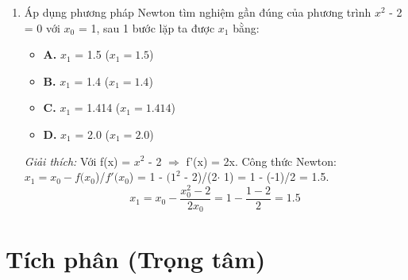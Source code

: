 \documentclass[11pt,a4paper,oneside]{book}
\begin{document}
\begin{enumerate}[label=\textbf{Câu \arabic*:}, leftmargin=2.2em, itemsep=8pt]
  \item Áp dụng phương pháp Newton tìm nghiệm gần đúng của phương trình $x^2$ - 2 = 0 với $x_0$ = 1, sau 1 bước lặp ta được $x_1$ bằng:
  \begin{itemize}[label={}, leftmargin=1em, itemsep=2pt]
    \item \textbf{A.} $x_1$ = 1.5 \quad ($x_1 = 1.5$)
    \item \textbf{B.} $x_1$ = 1.4 \quad ($x_1 = 1.4$)
    \item \textbf{C.} $x_1$ = 1.414 \quad ($x_1 = 1.414$)
    \item \textbf{D.} $x_1$ = 2.0 \quad ($x_1 = 2.0$)
  \end{itemize}
  \vspace{2pt}
   \textit{Giải thích:} Với f(x) = $x^2$ - 2 $\Rightarrow$  f'(x) = 2x. Công thức Newton: $x_1 = x_0 - f(x_0$)/$f'(x_0$) = 1 - $(1^2$ - 2)/(2$\cdot$ 1) = 1 - (-1)/2 = 1.5.
  \[ x_1 = x_0 - \frac{x_0^2 - 2}{2x_0} = 1 - \frac{1 - 2}{2} = 1.5 \]
\end{enumerate}

\chapter{Tích phân (Trọng tâm)}
\label{chap:chuong-5}
\end{document}
